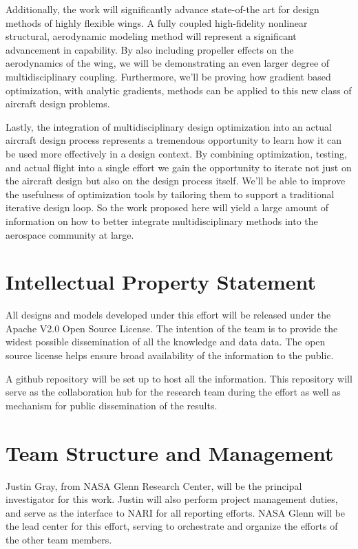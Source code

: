\documentclass[]{aiaa-tc}
\begin{document}
    Additionally, the work will significantly advance state-of-the art for design methods of highly flexible wings. 
    A fully coupled high-fidelity nonlinear structural, aerodynamic modeling method will represent a significant advancement 
    in capability. By also including propeller effects on the aerodynamics of the wing, we will be demonstrating an even larger 
    degree of multidisciplinary coupling. Furthermore, we'll be proving how gradient based optimization, with analytic gradients, 
    methods can be applied to this new class of aircraft design problems. 

    Lastly, the integration of multidisciplinary design optimization into an actual aircraft design process represents
    a tremendous opportunity to learn how it can be used more effectively in a design context. By combining optimization, 
    testing, and actual flight into a single effort we gain the opportunity to iterate not just on the aircraft 
    design but also on the design process itself. We'll be able to improve the usefulness of optimization tools by 
    tailoring them to support a traditional iterative design loop. So the work proposed here will yield a large amount 
    of information on how to better integrate multidisciplinary methods into the aerospace community at large. 

  
\section{Intellectual Property Statement}
    All designs and models developed under this effort will be released under the Apache V2.0 Open Source License. The intention 
    of the team is to provide the widest possible dissemination of all the knowledge and data data. The open source license helps 
    ensure broad availability of the information to the public. 

    A github repository will be set up to host all the information. This repository will serve as the collaboration 
    hub for the research team during the effort as well as mechanism for public dissemination of the results. 

\section{Team Structure and Management}
    Justin Gray, from NASA Glenn Research Center, will be the principal investigator for this work. Justin will also perform 
    project management duties, and serve as the interface to NARI for all reporting efforts. NASA Glenn will be the lead 
    center for this effort, serving to orchestrate and organize the efforts of the other team members. 
\end{document}
